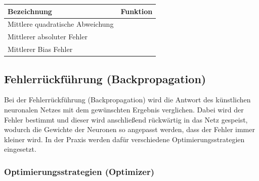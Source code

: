 	\begin{center}
	\begin{tabular}[t]{|l|l|}
		\hline
		\textbf{Bezeichnung} & \textbf{Funktion} \\
		\hline
		Mittlere quadratische Abweichung  &  
		\addvbuffer[0.05cm]{
			$ \textrm{\acs{mse}} = \frac{\sum_{i=1}^{n} (y_i - \hat{y_i})^2}{n} $
		} \\
		\hline
		Mittlerer absoluter Fehler  &  
		\addvbuffer[0.05cm]{
			$ \textrm{\acs{mae}} = \frac{\sum_{i=1}^{n} |y_i - \hat{y_i}|}{n} $
		} \\
		\hline
		Mittlerer Bias Fehler  &  
		\addvbuffer[0.05cm]{
			$ \textrm{\acs{mbe}} = \frac{\sum_{i=1}^{n} (y_i - \hat{y_i})}{n} $
		} \\
		\hline
		
	\end{tabular}
	\end{center}

\subsection{Fehlerrückführung (Backpropagation)}

	Bei der Fehlerrückführung (Backpropagation) wird die Antwort des künstlichen neuronalen Netzes mit dem gewünschten Ergebnis verglichen. Dabei wird der Fehler bestimmt und dieser wird anschließend rückwärtig in das Netz gespeist, wodurch die Gewichte der Neuronen so angepasst werden, dass der Fehler immer kleiner wird. In der Praxis werden dafür verschiedene Optimierungsstrategien eingesetzt. \cite{rocketloop}
	
\subsubsection{Optimierungsstrategien (Optimizer)}

